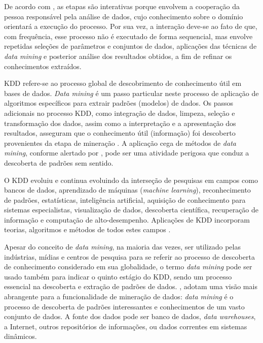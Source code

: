 De acordo com , as etapas são interativas porque envolvem a cooperação da pessoa responsável pela análise de dados, cujo conhecimento sobre o domínio orientará a execução do processo. Por sua vez, a interação deve-se ao fato de que, com frequência, esse processo não é executado de forma sequencial, mas envolve repetidas seleções de parâmetros e conjuntos de dados, aplicações das técnicas de \textit{data mining} e posterior análise dos resultados obtidos, a fim de refinar os conhecimentos extraídos.

KDD refere-se ao processo global de descobrimento de conhecimento útil em bases de dados. \textit{Data mining} é um passo particular neste processo de aplicação de algoritmos específicos para extrair padrões (modelos) de dados. Os passos adicionais no processo KDD, como integração de dados, limpeza, seleção e transformação dos dados, assim como a interpretação e a apresentação dos resultados, asseguram que o conhecimento útil (informação) foi descoberto provenientes da etapa de mineração \cite{han}. A aplicação cega de métodos de \textit{data mining}, conforme alertado por , pode ser uma atividade perigosa que conduz a descoberta de padrões sem sentido. 

O KDD evoluiu e continua evoluindo da interseção de pesquisas em campos como bancos de dados, aprendizado de máquinas (\textit{machine learning}), reconhecimento de padrões, estatísticas, inteligência artificial, aquisição de conhecimento para sistemas especialistas, visualização de dados, descoberta científica, recuperação de informação e computação de alto-desempenho. Aplicações de KDD incorporam teorias, algoritmos e métodos de todos estes campos \cite{credito-bancario}.

Apesar do conceito de \textit{data mining}, na maioria das vezes, ser utilizado pelas indústrias, mídias e centros de pesquisa para se referir ao processo de descoberta de conhecimento considerado em sua globalidade, o termo \textit{data mining} pode ser usado também para indicar o quinto estágio do KDD, sendo um processo essencial na descoberta e extração de padrões de dados. , adotam uma visão mais abrangente para a funcionalidade de mineração de dados: \textit{data mining} é o processo de descoberta de padrões interessantes e conhecimentos de um vasto conjunto de dados. A fonte dos dados pode ser banco de dados, \textit{data warehouses}, a Internet, outros repositórios de informações, ou dados correntes em sistemas dinâmicos.

